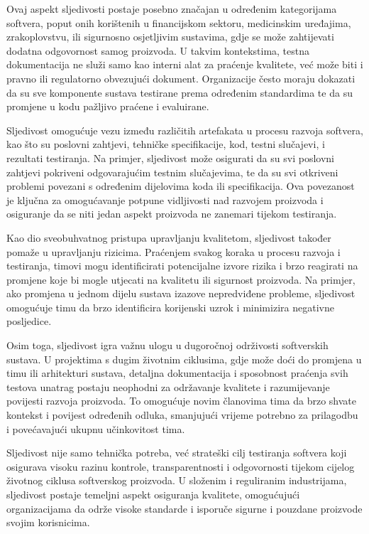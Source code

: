 Ovaj aspekt sljedivosti postaje posebno značajan u određenim kategorijama softvera, poput onih korištenih u financijskom sektoru, medicinskim uređajima, zrakoplovstvu, ili sigurnosno osjetljivim sustavima, gdje se može zahtijevati dodatna odgovornost samog proizvoda.
U takvim kontekstima, testna dokumentacija ne služi samo kao interni alat za praćenje kvalitete, već može biti i pravno ili regulatorno obvezujući dokument.
Organizacije često moraju dokazati da su sve komponente sustava testirane prema određenim standardima te da su promjene u kodu pažljivo praćene i evaluirane.

Sljedivost omogućuje vezu između različitih artefakata u procesu razvoja softvera, kao što su poslovni zahtjevi, tehničke specifikacije, kod, testni slučajevi, i rezultati testiranja.
Na primjer, sljedivost može osigurati da su svi poslovni zahtjevi pokriveni odgovarajućim testnim slučajevima, te da su svi otkriveni problemi povezani s određenim dijelovima koda ili specifikacija.
Ova povezanost je ključna za omogućavanje potpune vidljivosti nad razvojem proizvoda i osiguranje da se niti jedan aspekt proizvoda ne zanemari tijekom testiranja.

Kao dio sveobuhvatnog pristupa upravljanju kvalitetom, sljedivost također pomaže u upravljanju rizicima.
Praćenjem svakog koraka u procesu razvoja i testiranja, timovi mogu identificirati potencijalne izvore rizika i brzo reagirati na promjene koje bi mogle utjecati na kvalitetu ili sigurnost proizvoda.
Na primjer, ako promjena u jednom dijelu sustava izazove nepredviđene probleme, sljedivost omogućuje timu da brzo identificira korijenski uzrok i minimizira negativne posljedice.

Osim toga, sljedivost igra važnu ulogu u dugoročnoj održivosti softverskih sustava.
U projektima s dugim životnim ciklusima, gdje može doći do promjena u timu ili arhitekturi sustava, detaljna dokumentacija i sposobnost praćenja svih testova unatrag postaju neophodni za održavanje kvalitete i razumijevanje povijesti razvoja proizvoda.
To omogućuje novim članovima tima da brzo shvate kontekst i povijest određenih odluka, smanjujući vrijeme potrebno za prilagodbu i povećavajući ukupnu učinkovitost tima.

Sljedivost nije samo tehnička potreba, već strateški cilj testiranja softvera koji osigurava visoku razinu kontrole, transparentnosti i odgovornosti tijekom cijelog životnog ciklusa softverskog proizvoda.
U složenim i reguliranim industrijama, sljedivost postaje temeljni aspekt osiguranja kvalitete, omogućujući organizacijama da održe visoke standarde i isporuče sigurne i pouzdane proizvode svojim korisnicima.

